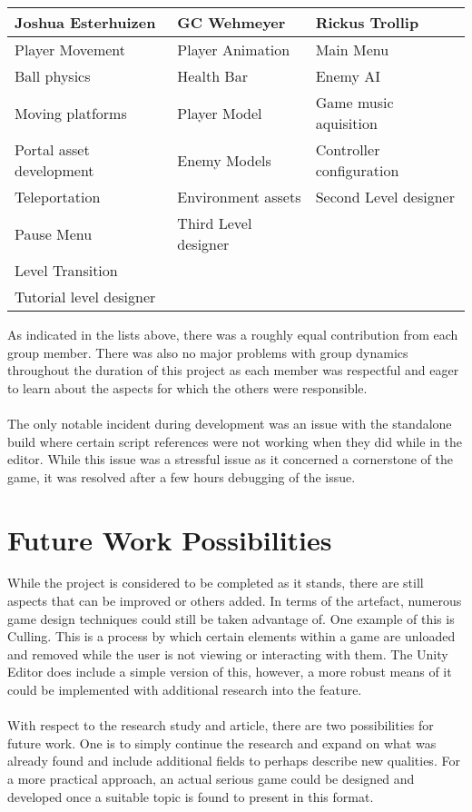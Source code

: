\begin{table}[H]
\begin{tabular}{l|l|l}
\hline
Joshua Esterhuizen       & GC Wehmeyer          & Rickus Trollip           \\ \hline
Player Movement          & Player Animation     & Main Menu                \\
Ball physics             & Health Bar           & Enemy AI                 \\
Moving platforms         & Player Model         & Game music aquisition    \\
Portal asset development & Enemy Models         & Controller configuration \\
Teleportation            & Environment assets   & Second Level designer    \\
Pause Menu               & Third Level designer &                          \\
Level Transition         &                      &                          \\
Tutorial level designer  &                      &                          \\ \hline
\end{tabular}
\end{table}

\noindent As indicated in the lists above, there was a roughly equal contribution from each group member. There was also no major problems with group dynamics throughout the duration of this project as each member was respectful and eager to learn about the aspects for which the others were responsible. 
\\\\
The only notable incident during development was an issue with the standalone build where certain script references were not working when they did while in the editor. While this issue was a stressful issue as it concerned a cornerstone of the game, it was resolved after a few hours debugging of the issue. 

\section{Future Work Possibilities}
While the project is considered to be completed as it stands, there are still aspects that can be improved or others added. In terms of the artefact, numerous game design techniques could still be taken advantage of. One example of this is Culling. This is a process by which certain elements within a game are unloaded and removed while the user is not viewing or interacting with them. The Unity Editor does include a simple version of this, however, a more robust means of it could be implemented with additional research into the feature. 
\\\\
With respect to the research study and article, there are two possibilities for future work. One is to simply continue the research and expand on what was already found and include additional fields to perhaps describe new qualities. For a more practical approach, an actual serious game could be designed and developed once a suitable topic is found to present in this format.

